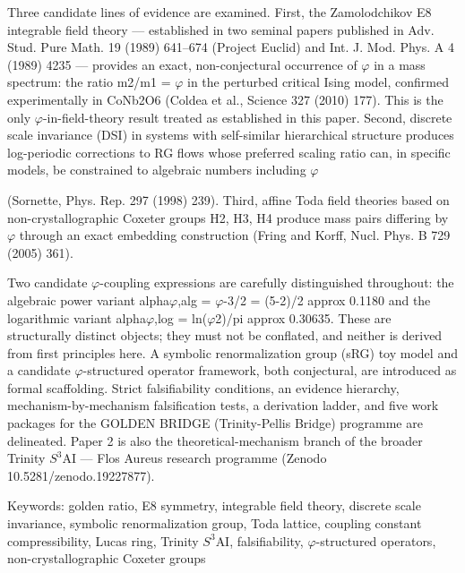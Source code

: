   Three candidate lines of evidence are examined. First, the Zamolodchikov E8 integrable
  field theory --- established in two seminal papers published in Adv. Stud. Pure Math. 19
  (1989) 641--674 (Project Euclid) and Int. J. Mod. Phys. A 4 (1989) 4235 --- provides an
  exact, non-conjectural occurrence of $\varphi$ in a mass spectrum: the ratio m2/m1 = $\varphi$ in the
  perturbed critical Ising model, confirmed experimentally in CoNb2O6 (Coldea et al.,
  Science 327 (2010) 177). This is the only $\varphi$-in-field-theory result treated as established
  in this paper. Second, discrete scale invariance (DSI) in systems with self-similar
  hierarchical structure produces log-periodic corrections to RG flows whose preferred
  scaling ratio can, in specific models, be constrained to algebraic numbers including $\varphi$

  (Sornette, Phys. Rep. 297 (1998) 239). Third, affine Toda field theories based on
  non-crystallographic Coxeter groups H2, H3, H4 produce mass pairs differing by $\varphi$
  through an exact embedding construction (Fring and Korff, Nucl. Phys. B 729 (2005)
  361).

  Two candidate $\varphi$-coupling expressions are carefully distinguished throughout: the
  algebraic power variant alpha$\varphi$,alg = $\varphi$-3/2 = (5-2)/2 approx 0.1180 and the logarithmic
  variant alpha$\varphi$,log = ln($\varphi$2)/pi approx 0.30635. These are structurally distinct objects;
  they must not be conflated, and neither is derived from first principles here. A symbolic
  renormalization group (sRG) toy model and a candidate $\varphi$-structured operator
  framework, both conjectural, are introduced as formal scaffolding. Strict falsifiability
  conditions, an evidence hierarchy, mechanism-by-mechanism falsification tests, a
  derivation ladder, and five work packages for the GOLDEN BRIDGE (Trinity-Pellis Bridge) programme are
  delineated. Paper 2 is also the theoretical-mechanism branch of the broader Trinity
  $S^{3}$AI --- Flos Aureus research programme (Zenodo 10.5281/zenodo.19227877).

  Keywords: golden ratio, E8 symmetry, integrable field theory, discrete scale invariance,
  symbolic renormalization group, Toda lattice, coupling constant compressibility, Lucas
  ring, Trinity $S^{3}$AI, falsifiability, $\varphi$-structured operators, non-crystallographic Coxeter
  groups